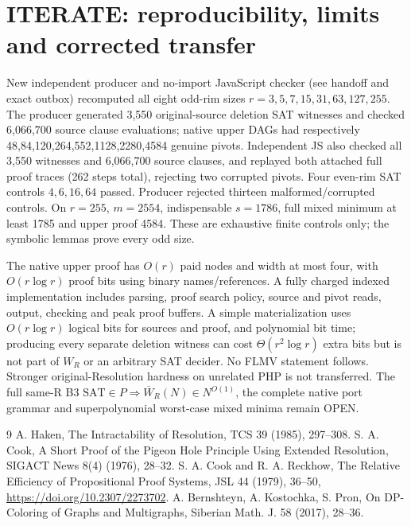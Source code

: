 \documentclass[11pt]{article}
\begin{document}
\section*{ITERATE: reproducibility, limits and corrected transfer}
New independent producer and no-import JavaScript checker (see handoff and exact outbox) recomputed all eight odd-rim sizes $r=3,5,7,15,31,63,127,255$. The producer generated 3,550 original-source deletion SAT witnesses and checked 6,066,700 source clause evaluations; native upper DAGs had respectively 48,84,120,264,552,1128,2280,4584 genuine pivots. Independent JS also checked all 3,550 witnesses and 6,066,700 source clauses, and replayed both attached full proof traces (262 steps total), rejecting two corrupted pivots. Four even-rim SAT controls $4,6,16,64$ passed. Producer rejected thirteen malformed/corrupted controls. On $r=255$, $m=2554$, indispensable $s=1786$, full mixed minimum at least 1785 and upper proof 4584. These are exhaustive finite controls only; the symbolic lemmas prove every odd size.
\par The native upper proof has $O(r)$ paid nodes and width at most four, with $O(r\log r)$ proof bits using binary names/references. A fully charged indexed implementation includes parsing, proof search policy, source and pivot reads, output, checking and peak proof buffers. A simple materialization uses $O(r\log r)$ logical bits for sources and proof, and polynomial bit time; producing every separate deletion witness can cost $\Theta(r^2\log r)$ extra bits but is not part of $W_R$ or an arbitrary SAT decider. No FLMV statement follows. Stronger original-Resolution hardness on unrelated PHP is not transferred. The full same-R B3 \(\mathrm{SAT}\in P\Rightarrow\overline W_R(N)\in N^{O(1)}\), the complete native port grammar and superpolynomial worst-case mixed minima remain OPEN.
\begin{thebibliography}{9}
 A. Haken, The Intractability of Resolution, TCS 39 (1985), 297--308.
 S. A. Cook, A Short Proof of the Pigeon Hole Principle Using Extended Resolution, SIGACT News 8(4) (1976), 28--32.
 S. A. Cook and R. A. Reckhow, The Relative Efficiency of Propositional Proof Systems, JSL 44 (1979), 36--50, \url{https://doi.org/10.2307/2273702}.
 A. Bernshteyn, A. Kostochka, S. Pron, On DP-Coloring of Graphs and Multigraphs, Siberian Math. J. 58 (2017), 28--36.
\end{thebibliography}
\end{document}
